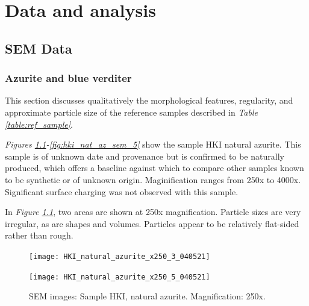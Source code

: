 \chapter{Data and analysis}

\ifpdf
    \graphicspath{{Chapter3/Figs/Raster/}{Chapter3/Figs/PDF/}{Chapter3/Figs/}}
\else
    \graphicspath{{Chapter3/Figs/Vector/}{Chapter3/Figs/}}
\fi

\section[SEM Data]{SEM Data}
\label{section3.1}

\subsection[Azurite and blue verditer]{Azurite and blue verditer}
\label{subsection3.1.1}

This section discusses qualitatively the morphological features, regularity, and approximate particle size of the reference samples described in \textit{Table \ref{table:ref_sample}}.  

\textit{Figures \ref{fig:hki_nat_az_sem_1}-\ref{fig:hki_nat_az_sem_5}} show the sample HKI natural azurite. This sample is of unknown date and provenance but is confirmed to be naturally produced, which offers a baseline against which to compare other samples known to be synthetic or of unknown origin. Maginification ranges from 250x to 4000x. Significant surface charging was not observed with this sample.

In \textit{Figure \ref{fig:hki_nat_az_sem_1}}, two areas are shown at 250x magnification. Particle sizes are very irregular, as are shapes and volumes. Particles appear to be relatively flat-sided rather than rough. 

\begin{figure}[H]
\centering
\begin{minipage}{.45\textwidth}
  \centering
  \texttt{[image: HKI\_natural\_azurite\_x250\_3\_040521]}
\end{minipage}
\begin{minipage}{.45\textwidth}
  \centering
  \texttt{[image: HKI\_natural\_azurite\_x250\_5\_040521]}
\end{minipage}
\caption[SEM images: Sample HKI, natural azurite]{SEM images: Sample HKI, natural azurite. Magnification: 250x.}
\label{fig:hki_nat_az_sem_1}
\end{figure}

